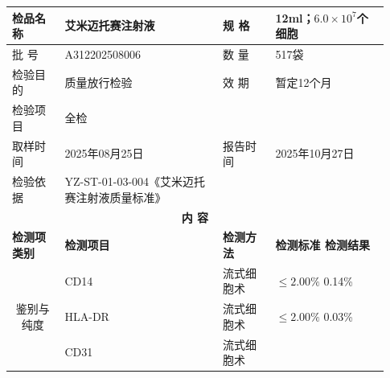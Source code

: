 \documentclass[UTF8,10pt,a4paper,fontset=fandol]{ctexart}
\newcommand{\fieldvalue}[1]{#1}
\begin{document}
\small
\begin{tabular}{|p{0.13\linewidth}|p{0.39\linewidth}|p{0.13\linewidth}|p{0.28\linewidth}|}
\hline
检品名称 &
\fieldvalue{艾米迈托赛注射液} &
规 格 &
\fieldvalue{12ml；$6.0\times10^{7}$个细胞}
\\ \hline
批 号 &
\fieldvalue{A312202508006} &
数 量 &
\fieldvalue{517袋}
\\ \hline
检验目的 &
\fieldvalue{质量放行检验} &
效 期 &
\fieldvalue{暂定12个月}
\\ \hline
检验项目 &
\fieldvalue{全检} &
& \\ \hline
取样时间 &
\fieldvalue{2025年08月25日} &
报告时间 &
\fieldvalue{2025年10月27日}
\\ \hline
检验依据 &
\fieldvalue{YZ-ST-01-03-004《艾米迈托赛注射液质量标准》}
& \multicolumn{2}{l|}{} \\ \hline
\multicolumn{4}{|c|}{\textbf{内 容}} \\ \hline
\textbf{检测项类别} & \textbf{检测项目} & \textbf{检测方法} &
\textbf{检测标准 \qquad 检测结果} \\ \hline
\multicolumn{1}{|c|}{\multirow{3}{*}{鉴别与纯度}} &
\fieldvalue{CD14} &
\fieldvalue{流式细胞术} &
\fieldvalue{$\leq 2.00\%$}
\quad
\fieldvalue{0.14\%}
\\ \cline{2-4}
& 
\fieldvalue{HLA-DR} &
\fieldvalue{流式细胞术} &
\fieldvalue{$\leq 2.00\%$}
\quad
\fieldvalue{0.03\%}
\\ \cline{2-4}
&
\fieldvalue{CD31} &
\fieldvalue{流式细胞术} &

\end{tabular}
\end{document}

